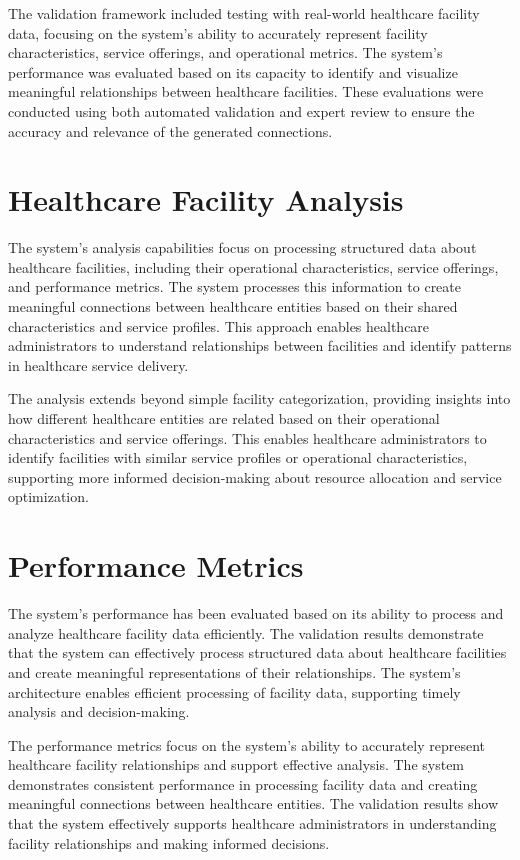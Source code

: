 \documentclass[12pt,a4paper]{report}
\begin{document}
The validation framework included testing with real-world healthcare facility data, focusing on the system's ability to accurately represent facility characteristics, service offerings, and operational metrics. The system's performance was evaluated based on its capacity to identify and visualize meaningful relationships between healthcare facilities. These evaluations were conducted using both automated validation and expert review to ensure the accuracy and relevance of the generated connections.

\section{Healthcare Facility Analysis}
The system's analysis capabilities focus on processing structured data about healthcare facilities, including their operational characteristics, service offerings, and performance metrics. The system processes this information to create meaningful connections between healthcare entities based on their shared characteristics and service profiles. This approach enables healthcare administrators to understand relationships between facilities and identify patterns in healthcare service delivery.

The analysis extends beyond simple facility categorization, providing insights into how different healthcare entities are related based on their operational characteristics and service offerings. This enables healthcare administrators to identify facilities with similar service profiles or operational characteristics, supporting more informed decision-making about resource allocation and service optimization.

\section{Performance Metrics}
The system's performance has been evaluated based on its ability to process and analyze healthcare facility data efficiently. The validation results demonstrate that the system can effectively process structured data about healthcare facilities and create meaningful representations of their relationships. The system's architecture enables efficient processing of facility data, supporting timely analysis and decision-making.

The performance metrics focus on the system's ability to accurately represent healthcare facility relationships and support effective analysis. The system demonstrates consistent performance in processing facility data and creating meaningful connections between healthcare entities. The validation results show that the system effectively supports healthcare administrators in understanding facility relationships and making informed decisions.
\end{document}
